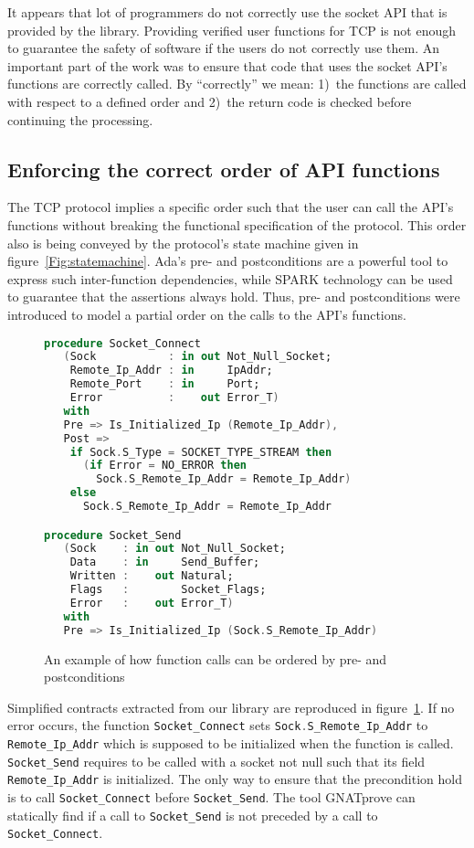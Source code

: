 \documentclass[conference]{IEEEtran}
\def\spark#1{\lstinline[language=Ada]{#1}}
\begin{document}
It appears that lot of programmers do not correctly use the socket API that is
provided by the library. Providing verified user functions for TCP is not enough
to guarantee the safety of software if the users do not correctly use them.
An important part of the work was to ensure that code that uses the socket API's
functions are correctly called. By ``correctly'' we mean: 1)~the functions
are called with respect to a defined order and 2)~the return code is checked
before continuing the processing.

\subsection{Enforcing the correct order of API functions}

The TCP protocol implies a specific order such that the user can call the API's
functions without breaking the functional specification of the protocol. This
order also is being conveyed by the protocol's state machine given in
figure~\ref{Fig:statemachine}.
Ada's pre- and postconditions are a powerful tool to express such inter-function
dependencies, while SPARK technology can be used to guarantee that the
assertions always hold. Thus, pre- and postconditions were introduced to model
a partial order on the calls to the API's functions.

\begin{figure}
\begin{lstlisting}[language=Ada,basicstyle=\footnotesize\ttfamily]
procedure Socket_Connect
   (Sock           : in out Not_Null_Socket;
    Remote_Ip_Addr : in     IpAddr;
    Remote_Port    : in     Port;
    Error          :    out Error_T)
   with
   Pre => Is_Initialized_Ip (Remote_Ip_Addr),
   Post =>
    if Sock.S_Type = SOCKET_TYPE_STREAM then
      (if Error = NO_ERROR then
        Sock.S_Remote_Ip_Addr = Remote_Ip_Addr)
    else
      Sock.S_Remote_Ip_Addr = Remote_Ip_Addr

procedure Socket_Send
   (Sock    : in out Not_Null_Socket;
    Data    : in     Send_Buffer;
    Written :    out Natural;
    Flags   :        Socket_Flags;
    Error   :    out Error_T)
   with
   Pre => Is_Initialized_Ip (Sock.S_Remote_Ip_Addr)
\end{lstlisting}
\caption{An example of how function calls can be ordered by pre- and
postconditions}
\label{fig:functionorder}
\end{figure}

Simplified contracts extracted from our library are reproduced in
figure~\ref{fig:functionorder}. If no error occurs, the function
\spark{Socket_Connect} sets \spark{Sock.S_Remote_Ip_Addr} to
\spark{Remote_Ip_Addr} which is supposed to be
initialized when the function is called. \spark{Socket_Send} requires to be
called with a socket not null such that its field \spark{Remote_Ip_Addr} is
initialized. The only way to ensure that the precondition hold is to
call \spark{Socket_Connect} before \spark{Socket_Send}.
The tool GNATprove can statically find if a call to \spark{Socket_Send}
is not preceded by a call to \spark{Socket_Connect}.
\end{document}
